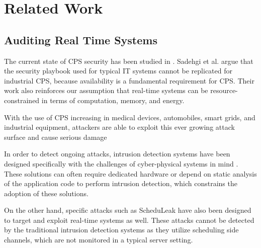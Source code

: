 \section{Related Work}

\subsection{Auditing Real Time Systems}
The current state of CPS security has been studied in \cite{sadeghi2015dac,cps_sec_survey17,2016cps_sec}.
Sadehgi et al. \cite{sadeghi2015dac} argue that the security playbook used for typical IT systems cannot be replicated for industrial CPS, because availability is a fundamental requirement for CPS. Their work also reinforces our assumption that real-time systems can be resource-constrained in terms of computation, memory, and energy. 

With the use of CPS increasing in medical devices, automobiles, smart grids, and industrial equipment, attackers are able to exploit this ever growing attack surface and cause serious damage \cite{cps_sec_survey17}  %

In order to detect ongoing attacks, intrusion detection systems have been designed specifically with the challenges of cyber-physical systems in mind \cite{2010cpsIDS,yoon2013rtas,pellizzoni2015}. These solutions can often require dedicated hardware \cite{yoon2013rtas} or depend on static analysis of the application code \cite{2010cpsIDS} to perform intrusion detection, which constrains the adoption of these solutions.

On the other hand, specific attacks such as ScheduLeak \cite{scheduleak19} have also been designed to target and exploit real-time systems as well. These attacks cannot be detected by the traditional intrusion detection systems as they utilize scheduling side channels, which are not monitored in a typical server setting.


